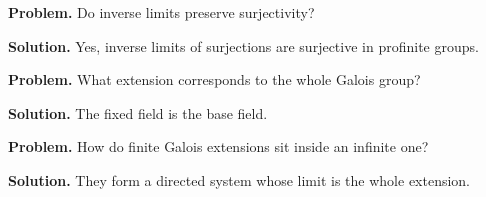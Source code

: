 \begin{example}\label{ex:sec11-8}
\textbf{Problem.} Do inverse limits preserve surjectivity?

\textbf{Solution.} Yes, inverse limits of surjections are surjective in profinite groups.
\end{example}

\begin{example}\label{ex:sec11-9}
\textbf{Problem.} What extension corresponds to the whole Galois group?

\textbf{Solution.} The fixed field is the base field.
\end{example}

\begin{example}\label{ex:sec11-10}
\textbf{Problem.} How do finite Galois extensions sit inside an infinite one?

\textbf{Solution.} They form a directed system whose limit is the whole extension.
\end{example}
